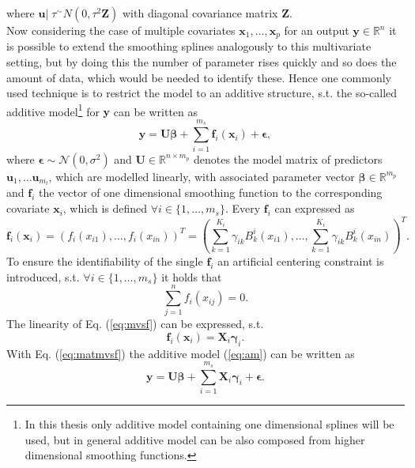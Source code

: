 \documentclass[12pt,letterpaper]{article}
\numberwithin{equation}{subsection}
\begin{document}
where $\mathbf{u}|\;\tau^ \sim N(0,\tau^2 \mathbf{Z})$ with diagonal covariance matrix $\mathbf{Z}$. \\
Now considering the case of multiple covariates $\mathbf{x}_1, \dots , \mathbf{x}_p$ for an output $\mathbf{y} \in \mathbb{R}^n$ it is possible to extend the smoothing splines analogously to this multivariate setting, but by doing this the number of parameter rises quickly and so does the amount of data, which would be needed to identify these. Hence one commonly used technique is to restrict the model to an additive structure, s.t. the so-called additive model\footnote{In this thesis only additive model containing one dimensional splines will be used, but in general additive model can be also composed from higher dimensional smoothing functions.} for $\mathbf{y}$ can be written as
\begin{equation}
\mathbf{y} = \mathbf{U}\mathbf{\beta} +  \sum^{m_s}_{i=1} \mathbf{f}_i(\mathbf{x}_i) + \mathbf{\epsilon},
\label{eq:am}
\end{equation}
where $\mathbf{\epsilon} \sim \mathcal{N}(0, \sigma^2)$ and $\mathbf{U}\in \mathbb{R}^{n\times m_{p}} $ denotes the model matrix of predictors $\mathbf{u}_1,\dots\mathbf{u}_{m_l}$, which are modelled linearly, with associated parameter vector $\mathbf{\beta} \in \mathbb{R}^{ m_{p}}$ and $\mathbf{f}_i$ the vector of one dimensional smoothing function to the corresponding covariate $\mathbf{x}_i$, which is defined $\forall i \in \{1,\dots ,m_{s}\}$. Every $\mathbf{f}_i$ can expressed as 
\begin{equation}
\mathbf{f}_i(\mathbf{x}_i) = (f_i(x_{i1}),\dots,f_i(x_{in}))^T = (\sum^{K_i}_{k=1}\gamma_{ik} B^i_k(x_{i1}),\dots,\sum^{K_i}_{k=1}\gamma_{ik} B^i_k(x_{in}))^T.
\label{eq:mvsf}
\end{equation}
To ensure the identifiability of the single $\mathbf{f}_i$ an artificial centering constraint is introduced, s.t. $\forall i \in \{1,\dots ,m_{s}\}$ it holds that
\begin{equation}
\sum^n_{j=1}f_i(x_{ij}) = 0.
\end{equation}  
The linearity of Eq. (\ref{eq:mvsf}) can be expressed, s.t. 
\begin{equation}
\mathbf{f}_i(\mathbf{x}_i) = \mathbf{X}_i\mathbf{\gamma}_i.
\label{eq:matmvsf}
\end{equation}
With Eq. (\ref{eq:matmvsf}) the additive model (\ref{eq:am}) can be written as
\begin{equation}
\mathbf{y} = \mathbf{U}\mathbf{\beta} +  \sum^{m_s}_{i=1} \mathbf{X}_i\mathbf{\gamma}_i + \mathbf{\epsilon}.
\label{eq:matam}
\end{equation}
\end{document}

